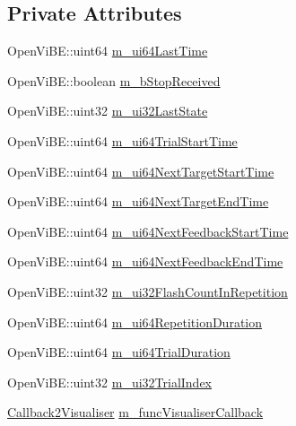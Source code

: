 \subsection*{Private Attributes}
\begin{DoxyCompactItemize}
\item 
OpenViBE::uint64 \hyperlink{classOpenViBEApplications_1_1ExternalP300Stimulator_aa793ee4468bce136695dddda133fa118}{m\_\-ui64LastTime}
\item 
OpenViBE::boolean \hyperlink{classOpenViBEApplications_1_1ExternalP300Stimulator_a1096733229e1cb706f680fb13a3604dd}{m\_\-bStopReceived}
\item 
OpenViBE::uint32 \hyperlink{classOpenViBEApplications_1_1ExternalP300Stimulator_a2ffc9f64c02c1cd820e4d6c8902f706e}{m\_\-ui32LastState}
\item 
OpenViBE::uint64 \hyperlink{classOpenViBEApplications_1_1ExternalP300Stimulator_a4f8b4004855cf57ff8e0daabc17bc695}{m\_\-ui64TrialStartTime}
\item 
OpenViBE::uint64 \hyperlink{classOpenViBEApplications_1_1ExternalP300Stimulator_ae7a789d929cfc3978ef3850316ca4cf6}{m\_\-ui64NextTargetStartTime}
\item 
OpenViBE::uint64 \hyperlink{classOpenViBEApplications_1_1ExternalP300Stimulator_ada99d85505fce68b63490fc4d2d4cd1c}{m\_\-ui64NextTargetEndTime}
\item 
OpenViBE::uint64 \hyperlink{classOpenViBEApplications_1_1ExternalP300Stimulator_a19adb681aef830a036b9ec3115c24f1b}{m\_\-ui64NextFeedbackStartTime}
\item 
OpenViBE::uint64 \hyperlink{classOpenViBEApplications_1_1ExternalP300Stimulator_a9f670da02a4ef421201d75bdc59f297e}{m\_\-ui64NextFeedbackEndTime}
\item 
OpenViBE::uint32 \hyperlink{classOpenViBEApplications_1_1ExternalP300Stimulator_a87ff8e13e35d06c41eb21000eba57399}{m\_\-ui32FlashCountInRepetition}
\item 
OpenViBE::uint64 \hyperlink{classOpenViBEApplications_1_1ExternalP300Stimulator_a14bfd36c8ee721d25a2937d87d667d55}{m\_\-ui64RepetitionDuration}
\item 
OpenViBE::uint64 \hyperlink{classOpenViBEApplications_1_1ExternalP300Stimulator_a0e7dffffd8d76517824e07548a117dc2}{m\_\-ui64TrialDuration}
\item 
OpenViBE::uint32 \hyperlink{classOpenViBEApplications_1_1ExternalP300Stimulator_a02cecceeaec533f6efc01e4645ecae0b}{m\_\-ui32TrialIndex}
\item 
\hyperlink{namespaceOpenViBEApplications_a3cd8eac2f1ee289a3a5a2fda466ffc97}{Callback2Visualiser} \hyperlink{classOpenViBEApplications_1_1ExternalP300Stimulator_af5d51012e6e3eaf91503a57476d894b9}{m\_\-funcVisualiserCallback}

\end{DoxyCompactItemize}
